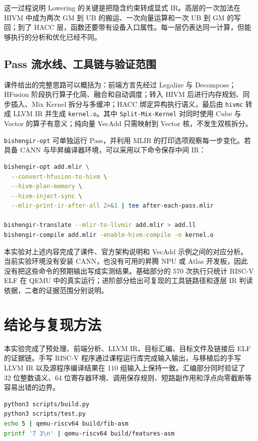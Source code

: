 \documentclass[UTF8,a4paper,10pt]{ctexart}
\begin{document}
这一过程说明 Lowering 的关键是把隐含约束转成显式 IR。高层的一次加法在 HIVM 中成为两次 GM 到 UB 的搬运、一次向量运算和一次 UB 到 GM 的写回；到了 HACC 层，函数还要带有设备入口属性。每一层仍表达同一计算，但能够执行的分析和优化已经不同。

\subsection{Pass 流水线、工具链与验证范围}

课件给出的完整思路可以概括为：前端方言先经过 Legalize 与 Decompose；HFusion 阶段执行算子化简、融合和自动调度；转入 HIVM 后进行内存规划、同步插入、Mix Kernel 拆分与多缓冲；HACC 绑定异构执行语义，最后由 \texttt{hivmc} 转成 LLVM IR 并生成 \texttt{kernel.o}。其中 \texttt{Split-Mix-Kernel} 对同时使用 Cube 与 Vector 的算子有意义；纯向量 VecAdd 只需映射到 Vector 核，不发生双核拆分。

\texttt{bishengir-opt} 可单独运行 Pass，并利用 MLIR 的打印选项观察每一步变化。若具备 CANN 与毕昇编译器环境，可以采用以下命令保存中间 IR：

\begin{lstlisting}[language=bash,caption={逐 Pass 观察 AscendNPU IR 的命令形式}]
bishengir-opt add.mlir \
  --convert-hfusion-to-hivm \
  --hivm-plan-memory \
  --hivm-inject-sync \
  --mlir-print-ir-after-all 2>&1 | tee after-each-pass.mlir

bishengir-translate --mlir-to-llvmir add.mlir > add.ll
bishengir-compile add.mlir -enable-hivm-compile -o kernel.o
\end{lstlisting}

本实验对上述内容完成了课件、官方架构说明和 VecAdd 示例之间的对应分析\cite{ascend-example,ascend-arch}。当前实验环境没有安装 CANN，也没有可用的昇腾 NPU 或 Atlas 开发板，因此没有把这些命令的预期输出写成实测结果。基础部分的 570 次执行只统计 RISC-V ELF 在 QEMU 中的真实运行；进阶部分给出可复现的工具链路径和逐层 IR 判读依据，二者的证据范围分别说明。

\section{结论与复现方法}

本实验完成了预处理、前端分析、LLVM IR、目标汇编、目标文件及链接后 ELF 的证据链。手写 RISC-V 程序通过课程运行库完成输入输出，与移植后的手写 LLVM IR 以及源程序编译结果在 110 组输入上保持一致。汇编部分同时验证了 32 位整数语义、64 位寄存器环境、调用保存规则、短路副作用和浮点向零截断等容易出错的边界。

\begin{lstlisting}[language=bash,caption={实验复现命令}]
python3 scripts/build.py
python3 scripts/test.py
echo 5 | qemu-riscv64 build/fib-asm
printf '7 3\n' | qemu-riscv64 build/features-asm
\end{lstlisting}



\end{document}
